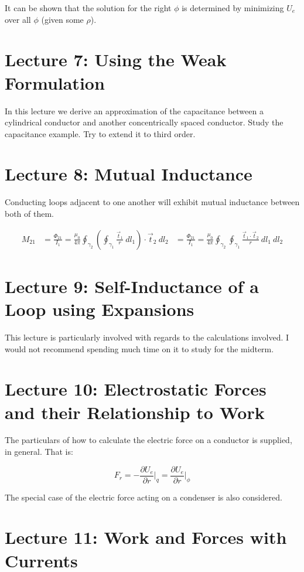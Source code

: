\documentclass{article}
\begin{document}
It can be shown that the solution for the right $\phi$ is determined by
minimizing $U_e$ over all $\phi$ (given some $\rho$). 

\section*{Lecture 7: Using the Weak Formulation}
In this lecture we derive an approximation of the capacitance between a
cylindrical conductor and another concentrically spaced conductor. Study the
capacitance example. Try to extend it to third order.

\section*{Lecture 8: Mutual Inductance}
Conducting loops adjacent to one another will exhibit mutual inductance between
both of them. 

\begin{align*}
    M_{21} &= \frac{\Phi_{21}}{I_1} = \frac{\mu_0}{4\pi} \oint_{\gamma_2}
    \left(\oint_{\gamma_1} \frac{\vec{t}_1}{r}~dl_1\right) \cdot \vec{t}_2~dl_2
    &= \frac{\Phi_{21}}{I_1} = \frac{\mu_0}{4\pi} \oint_{\gamma_2}
    \oint_{\gamma_1} \frac{\vec{t}_1 \cdot \vec{t}_2}{r}~dl_1 ~dl_2
\end{align*}

\section*{Lecture 9: Self-Inductance of a Loop using Expansions}
This lecture is particularly involved with regards to the calculations involved.
I would not recommend spending much time on it to study for the midterm.

\section*{Lecture 10: Electrostatic Forces and their Relationship to Work}
The particulars of how to calculate the electric force on a conductor is
supplied, in general. That is:

\[ 
        F_r = - \frac{\partial U_e}{\partial r}\Big|_q = \frac{\partial
        U_e}{\partial r}\Big|_\phi
\]

The special case of the electric force acting on a condenser is also considered.

\section*{Lecture 11: Work and Forces with Currents}
\end{document}
